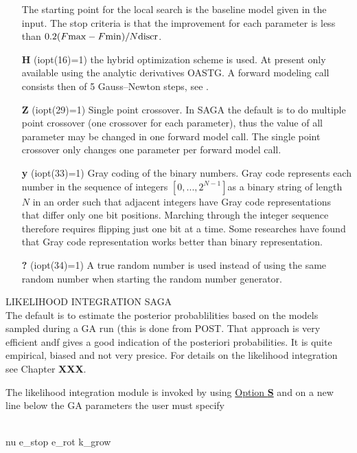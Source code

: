 \documentclass{saclantc}
\begin{document}
\begin{itemize}
The starting point for the local search is
the baseline model given in the input.
The stop criteria is that the improvement for each parameter is less than
$0.2 (F{\rm max}-F{\rm min}) /N{\rm discr}$.
\vspace{-0.3cm}
    \item[{\bf H}] (iopt(16)=1) the hybrid optimization scheme is used.
{ At present only available using the analytic derivatives {\sf OASTG}}.
A forward modeling call consists then of 5 Gauss--Newton steps,
 see \cite{gerstoft:asa95}.
\vspace{-0.3cm}
    \item[{\bf Z}] (iopt(29)=1) Single point crossover. In SAGA the default is to do multiple point crossover (one crossover for each parameter), thus the value of all parameter may be changed in one forward model call. The single point crossover only changes one parameter per forward model call.
\vspace{-0.3cm}
    \item[{\bf y}] (iopt(33)=1) Gray  coding \cite{heitkoetter} of the binary numbers. 
Gray code represents each number in the sequence of integers $[0,...,2^{N-1}]$as a binary string of length $N$ in an order such that adjacent integers have Gray code representations that differ only one bit positions. Marching through the integer sequence therefore requires flipping just one bit at a time. Some researches have found that Gray code representation works better than binary representation. 
\vspace{-0.3cm}
    \item[{\bf ?}] (iopt(34)=1) A true random number is used instead
 of 
using  the same random
    number when starting the random number generator.
\end{itemize}

\noindent LIKELIHOOD INTEGRATION {\sf SAGA} \\
The default is to estimate the posterior probablilities based on the
models sampled during a GA run (this is done from {\sf POST}. That
approach is very efficient andf gives a good indication of the
posteriori probabilities. It is quite empirical, biased and not very
presice.
For details on the likelihood integration see Chapter {\bf XXX}.

The likelihood integration module is invoked by using
\underline{Option {\bf S}} and on a new line below the GA parameters
the user must specify
\\
\\
\begin{tt}
nu   e\_{stop} e\_{rot} k\_{grow}
\end{tt}
\end{document}

